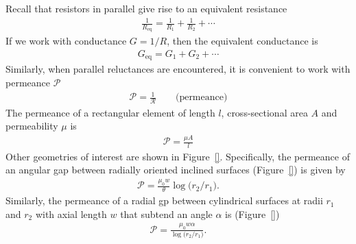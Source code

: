 \documentclass[11pt,a4paper,oneside]{book}
\numberwithin{equation}{section}
\theoremstyle{it}
\theoremstyle{definition}
\begin{document}
Recall that resistors in parallel give rise to an equivalent resistance 
\begin{equation*}\label{}
	{\begin{aligned}
			\frac{1}{R_\text{eq}}=\frac{1}{R_1}+\frac{1}{R_2}+\cdots
	\end{aligned}}
\end{equation*} 
If we work with conductance $G=1/R$, then the equivalent conductance is
\begin{equation*}\label{}
	{\begin{aligned}
			G_\text{eq}=G_1+G_2+\cdots
	\end{aligned}}
\end{equation*} 
Similarly, when parallel reluctances  are encountered, it is convenient to work with permeance $\mathscr{P}$
\begin{equation*}\label{}
	{\begin{aligned}
		\mathscr{P}=\frac{1}{\mathscr{R}}\qquad\text{(permeance)}
	\end{aligned}}
\end{equation*} 
The permeance of a rectangular element of length $l$, cross-sectional area $A$ and permeability $\mu$ is
\begin{equation*}\label{}
	{\begin{aligned}
			\mathscr{P}=\frac{\mu A}{l}
	\end{aligned}}
\end{equation*} 
Other geometries of interest are shown in Figure~\ref{}. Specifically, the permeance of an angular gap between radially oriented inclined surfaces (Figure~\ref{}) is given by
\begin{equation*}\label{}
	{\begin{aligned}
			\mathscr{P}=\frac{\mu_0 w}{\theta}\log\Big(r_2/r_1\Big).
	\end{aligned}}
\end{equation*}  
Similarly, the permeance of a radial gp between cylindrical surfaces at radii $r_1$ and $r_2$ with axial length $w$ that subtend an angle $\alpha$ is (Figure~\ref{}) 
\begin{equation*}\label{}
	{\begin{aligned}
			\mathscr{P}=\frac{\mu_0 w \alpha}{\log\Big(r_2/r_1\Big)}.
	\end{aligned}}
\end{equation*}
\end{document}

